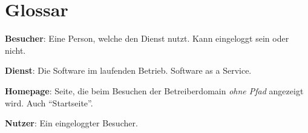 \documentclass[parskip=full,11pt,twoside]{scrartcl}
\begin{document}
\section{Glossar}

\textbf{Besucher}:
Eine Person, welche den Dienst nutzt.
Kann eingeloggt sein oder nicht.

\textbf{Dienst}:
Die Software im laufenden Betrieb. Software as a Service.

\textbf{Homepage}:
Seite, die beim Besuchen der Betreiberdomain \emph{ohne Pfad} angezeigt wird. Auch \enquote{Startseite}.

\textbf{Nutzer}:
Ein eingeloggter Besucher.
\end{document}
